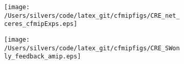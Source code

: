 \documentclass[varwidth, border=10pt]{standalone}
\begin{document}
\begin{figure}
  \centering
  \begin{subfigure}{0.48\textwidth}
  \texttt{[image: /Users/silvers/code/latex\_git/cfmipfigs/CRE\_net\_ceres\_cfmipExps.eps]}
\end{subfigure}
\begin{subfigure}{0.48\textwidth}
  \texttt{[image: /Users/silvers/code/latex\_git/cfmipfigs/CRE\_SWonly\_feedback\_amip.eps]}
\end{subfigure}
\end{figure}
\end{document}

